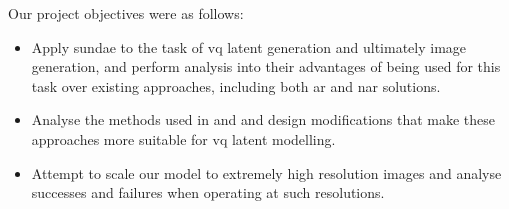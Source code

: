 
Our project objectives were as follows:
\begin{itemize}
    \item Apply \gls{sundae} to the task of \acrshort{vq} latent generation and
        ultimately image generation, and perform analysis into their advantages
        of being used for this task over existing approaches, including both
        \gls{ar} and \gls{nar} solutions.

    \item Analyse the methods used in \citet{savinov2022stepunrolled} and
        \citet{nawrot2021hierarchical} and design modifications that make these
        approaches more suitable for \acrshort{vq} latent modelling.

    \item Attempt to scale our model to extremely high resolution images and
        analyse successes and failures when operating at such resolutions. 

\end{itemize}
